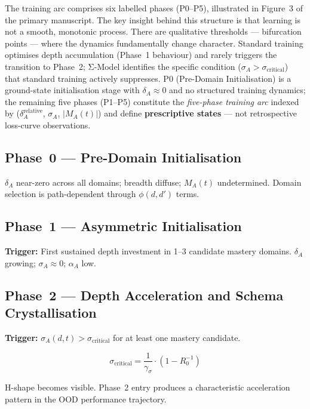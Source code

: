 \documentclass[11pt]{article}
\theoremstyle{definition}
\theoremstyle{plain}
\begin{document}
The training arc comprises six labelled phases (P0--P5), illustrated in Figure~3 of the primary manuscript. The key insight behind this structure is that learning is not a smooth, monotonic process. There are qualitative thresholds --- bifurcation points --- where the dynamics fundamentally change character. Standard training optimises depth accumulation (Phase~1 behaviour) and rarely triggers the transition to Phase~2; Σ-Model identifies the specific condition ($\sigma_A > \sigma_{\text{critical}}$) that standard training actively suppresses. P0
(Pre-Domain Initialisation) is a ground-state initialisation stage
with $\delta_A \approx 0$ and no structured training dynamics; the
remaining five phases (P1--P5) constitute the \emph{five-phase
training arc} indexed by
($\delta_A^{\text{relative}}$, $\sigma_A$, $|M_A(t)|$) and define
\textbf{prescriptive states} --- not retrospective loss-curve
observations.

\subsection*{Phase~0 --- Pre-Domain Initialisation}

$\delta_A$ near-zero across all domains; breadth diffuse; $M_A(t)$
undetermined. Domain selection is path-dependent through $\phi(d,d')$
terms.

\subsection*{Phase~1 --- Asymmetric Initialisation}

\textbf{Trigger:} First sustained depth investment in 1--3 candidate
mastery domains. $\delta_A$ growing; $\sigma_A \approx 0$; $\alpha_A$
low.

\subsection*{Phase~2 --- Depth Acceleration and Schema Crystallisation}

\textbf{Trigger:} $\sigma_A(d,t) > \sigma_{\text{critical}}$ for at
least one mastery candidate.

\begin{equation}\label{eq:sigma-critical}
\sigma_{\text{critical}} = \frac{1}{\gamma_\sigma} \cdot (1 - R_0^{-1})
\end{equation}

H-shape becomes visible. Phase~2 entry produces a characteristic
acceleration pattern in the OOD performance trajectory.
\end{document}
